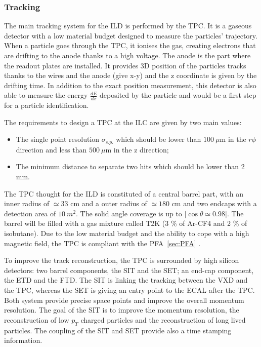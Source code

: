       \subsubsection{Tracking}

      The main tracking system for the \gls{ILD} is performed by the \gls{TPC}.
      It is a gaseous detector with a low material budget designed to measure the particles' trajectory.
      When a particle goes through the \gls{TPC}, it ionises the gas, creating electrons that are drifting to the anode thanks to a high voltage.
      The anode is the part where the readout plates are installed.
      It provides 3D position of the particles tracks thanks to the wires and the anode (give x-y) and the z coordinate is given by the drifting time.
      In addition to the exact position measurement, this detector is also able to measure the energy $\frac{dE}{dx}$ deposited by the particle and would be a first step for a particle identification.

      The requirements to design a \gls{TPC} at the \gls{ILC} are given by two main values: 
      
      \begin{itemize} 
        \item The single point resolution $\sigma_{s.p.}$ which should be lower than $100 \ \mu\text{m}$ in the $r\phi$ direction and less than $500 \ \mu\text{m}$ in the z direction;
        \item The minimum distance to separate two hits which should be lower than 2 mm.
      \end{itemize}

      The \gls{TPC} thought for the \gls{ILD} is constituted of a central barrel part, with an inner radius of $\simeq 33 \text{ cm}$ and a outer radius of $\simeq 180 \text{ cm}$ and two endcaps with a detection area of $10 \ m^2$. 
      The solid angle coverage is up to $|\cos{\theta} \simeq 0.98|$.
      The barrel will be filled with a gas mixture called T2K (3 \% of Ar-CF4 and 2 \% of isobutane).
      Due to the low material budget and the ability to cope with a high magnetic field, the \gls{TPC} is compliant with the \gls{PFA}~\ref{sec:PFA} . 


      To improve the track reconstruction, the \gls{TPC} is surrounded by high silicon detectors: two barrel components, the \gls{SIT} and the \gls{SET}; an end-cap component, the \gls{ETD} and the \gls{FTD}.
      The \gls{SIT} is linking the tracking between the \gls{VXD} and the \gls{TPC}, whereas the \gls{SET} is giving an entry point to the \gls{ECAL} after the \gls{TPC}.
      Both system provide precise space points and improve the overall momentum resolution.
      The goal of the \gls{SIT} is to improve the momentum resolution, the reconstruction of low $p_{T}$ charged particles and the reconstruction of long lived particles.
      The coupling of the \gls{SIT} and \gls{SET} provide also a time stamping information.

